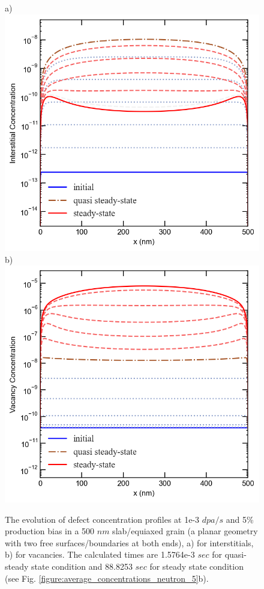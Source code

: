 \documentclass[utf8]{frontiersSCNS} %
\begin{document}
    \begin{figure}[h!]
        \centering
        a)\includegraphics[scale=0.55]{Fig3_a}
        b)\includegraphics[scale=0.55]{Fig3_b}
        \caption{The evolution of defect concentration profiles at 1e-3 $dpa/s$ and 5\% production bias in a 500 $nm$ slab/equiaxed grain (a planar geometry with two free surfaces/boundaries at both ends), a) for interstitials, b) for vacancies. The calculated times are 1.5764e-3 $sec$ for quasi-steady state condition and 88.8253 $sec$ for steady state condition (see Fig. \ref{figure:average_concentrations_neutron_5}b). }
        \label{figure:time_evolution_5_1e-3_500nm}
    \end{figure}
    
\end{document}
